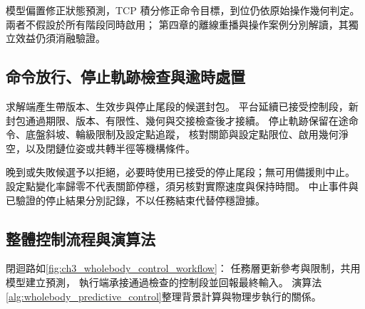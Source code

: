 模型偏置修正狀態預測，TCP 積分修正命令目標，到位仍依原始操作幾何判定。
兩者不假設於所有階段同時啟用；
第四章的離線重播與操作案例分別解讀，其獨立效益仍須消融驗證。

\subsection{命令放行、停止軌跡檢查與逾時處置}
\label{subsec:command_acceptance_stopping}

求解端產生帶版本、生效步與停止尾段的候選封包。
平台延續已接受控制段，新封包通過期限、版本、有限性、幾何與交接檢查後才接續。
停止軌跡保留在途命令、底盤斜坡、輪級限制及設定點追蹤，
核對關節與設定點限位、啟用幾何淨空，以及閉鏈位姿或共轉半徑等機構條件。

晚到或失敗候選予以拒絕，必要時使用已接受的停止尾段；無可用備援則中止。
設定點變化率歸零不代表關節停穩，須另核對實際速度與保持時間。
中止事件與已驗證的停止結果分別記錄，不以任務結束代替停穩證據。

\subsection{整體控制流程與演算法}
\label{subsec:overall_control_algorithm}

閉迴路如\cref{fig:ch3_wholebody_control_workflow}：
任務層更新參考與限制，共用模型建立預測，
執行端承接通過檢查的控制段並回報最終輸入。
演算法\ref{alg:wholebody_predictive_control}整理背景計算與物理步執行的關係。

